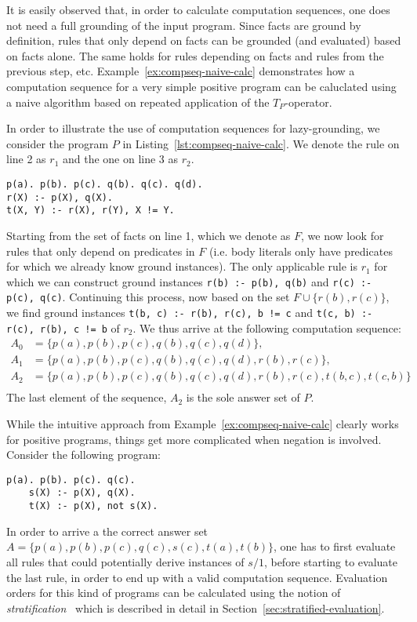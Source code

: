It is easily observed that, in order to calculate computation sequences, one does not need a full grounding of the input program. Since facts are ground by definition, rules that only depend on facts can be grounded (and evaluated) based on facts alone. The same holds for rules depending on facts and rules from the previous step, etc. Example~\ref{ex:compseq-naive-calc} demonstrates how a computation sequence for a very simple positive program can be caluclated using a naive algorithm based on repeated application of the $T_P$-operator.

\begin{example}
\label{ex:compseq-naive-calc}
In order to illustrate the use of computation sequences for lazy-grounding, we consider the program $P$ in Listing~\ref{lst:compseq-naive-calc}. We denote the rule on line 2 as $r_1$ and the one on line 3 as $r_2$.
\begin{lstlisting}[style=asp-code, label={lst:compseq-naive-calc}, caption={A positive, non-ground program}]
p(a). p(b). p(c). q(b). q(c). q(d).
r(X) :- p(X), q(X).
t(X, Y) :- r(X), r(Y), X != Y.	
\end{lstlisting}
Starting from the set of facts on line 1, which we denote as $F$, we now look for rules that only depend on predicates in $F$ (i.e. body literals only have predicates for which we already know ground instances). The only applicable rule is $r_1$ for which we  can construct ground instances \texttt{r(b) :- p(b), q(b)} and \texttt{r(c) :- p(c), q(c)}. Continuing this process, now based on the set $F \cup \{r(b),r(c)\}$, we find ground instances \texttt{t(b, c) :- r(b), r(c), b != c} and \texttt{t(c, b) :- r(c), r(b), c != b} of $r_2$. We thus arrive at the following computation sequence:
\begin{align*}
	A_0 &= \{p(a), p(b), p(c), q(b), q(c), q(d)\},\\
	A_1 &= \{p(a), p(b), p(c), q(b), q(c), q(d), r(b), r(c)\},\\
	A_2 &= \{p(a), p(b), p(c), q(b), q(c), q(d), r(b), r(c), t(b, c), t(c, b)\}\\
\end{align*}	
The last element of the sequence, $A_2$ is the sole answer set of $P$.
\end{example}	

While the intuitive approach from Example~\ref{ex:compseq-naive-calc} clearly works for positive programs, things get more complicated when negation is involved. Consider the following program:
\begin{lstlisting}[style=asp-code]
	p(a). p(b). p(c). q(c).
	s(X) :- p(X), q(X).
	t(X) :- p(X), not s(X).
\end{lstlisting}
In order to arrive a the correct answer set $A = \{p(a), p(b), p(c), q(c), s(c), t(a), t(b)\}$, one has to first evaluate all rules that could potentially derive instances of $s/1$, before starting to evaluate the last rule, in order to end up with a valid computation sequence. Evaluation orders for this kind of programs can be calculated using the notion of \emph{stratification}~\cite{stratification} which is described in detail in Section~\ref{sec:stratified-evaluation}.

